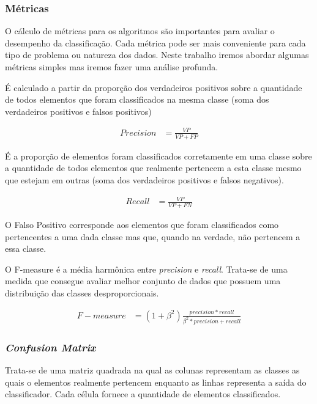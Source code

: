 \subsubsection{Métricas}
O cálculo de métricas para os algoritmos são importantes para avaliar o desempenho da classificação. Cada métrica pode ser mais conveniente para cada tipo de problema ou natureza dos dados. Neste trabalho iremos abordar algumas métricas simples mas iremos fazer uma análise profunda.


É calculado a partir da proporção dos verdadeiros positivos sobre a quantidade de todos elementos que foram classificados na mesma classe (soma dos verdadeiros positivos e falsos positivos)

\begin{equation}
  \label{eq:precision}
  \begin{aligned}
Precision &= \frac{VP}{VP + FP} 
  \end{aligned}  
\end{equation}


É a proporção de elementos foram classificados corretamente em uma classe 
sobre a quantidade de todos elementos que realmente pertencem a esta classe mesmo que estejam em outras (soma dos verdadeiros positivos e falsos negativos). 

\begin{equation}
  \label{eq:precision}
  \begin{aligned}
Recall &= \frac{VP}{VP + FN} 
  \end{aligned}  
\end{equation}

O Falso Positivo corresponde aos elementos que foram classificados como pertencentes a uma dada classe mas que, quando na verdade, não pertencem a essa classe.

O F-measure é a média harmônica entre \emph{precision} e \emph{recall}. Trata-se de uma medida que consegue avaliar melhor conjunto de dados que possuem uma distribuição das classes desproporcionais. 

\begin{equation}
  \label{eq:precision}
  \begin{aligned}
F-measure &= (1 + \beta^{2})\frac{precision*recall}{\beta^{2}*precision + recall} 
  \end{aligned}  
\end{equation}

\subsubsection{\emph{Confusion Matrix}}
Trata-se de uma matriz quadrada na qual 
as colunas representam as classes as quais o elementos realmente pertencem enquanto as linhas representa a saída do classificador. Cada célula fornece a quantidade de elementos classificados.

